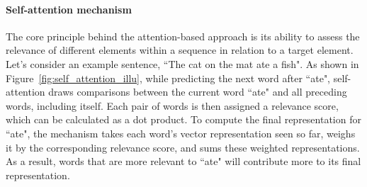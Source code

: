 \paragraph{Self-attention mechanism} The core principle behind the attention-based approach is its ability to assess the relevance of different elements within a sequence in relation to a target element. Let's consider an example sentence, ``The cat on the mat ate a fish". As shown in Figure~\ref{fig:self_attention_illu}, while predicting the next word after ``ate", self-attention draws comparisons between the current word ``ate" and all preceding words, including itself. Each pair of words is then assigned a relevance score, which can be calculated as a dot product. 
To compute the final representation for ``ate", the mechanism takes each word's vector representation seen so far, weighs it by the corresponding relevance score, and sums these weighted representations. As a result, words that are more relevant to ``ate" will contribute more to its final representation. 

